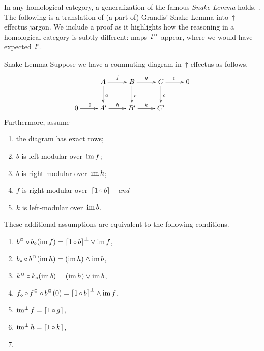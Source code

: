 \documentclass[b]{subfiles}
\begin{document}
\begin{parsec}%
\begin{point}%
In any homological category,
    a generalization of the famous \emph{Snake Lemma} holds.
    \cite[\S3.4]{grandis}.
The following is a translation of (a part of) Grandis' Snake Lemma
    into~$\dagger$-effectus jargon.
We include a proof as it highlights how
    the reasoning in a homological category is subtly different:
    maps~$l^\BOX$ appear, where we would have expected~$l^\diamond$.
\end{point}
\begin{point}{Snake Lemma}%
Suppose we have a commuting
    diagram in~$\dagger$-effectus as follows.
\begin{equation*}
    \xymatrix{
        &A \ar[d]^{a} \ar[r]^f
    &B \ar[d]^{b} \ar[r]^g
    &C \ar[d]^{c} \ar[r]^0
    &0
    \\0 \ar[r]^{0}
    &A' \ar[r]^{h}
    &B' \ar[r]^{k}
    &C'
}
\end{equation*}
Furthermore, assume
\begin{enumerate}
    \item the diagram has exact rows;
    \item  $b$ is left-modular over~$\operatorname{im} f$;
    \item $b$ is right-modular over~$\operatorname{im} h$;
    \item $f$ is right-modular over~$\left\lceil1 \mathop{\circ} b\right\rceil^\perp$ \emph{and}
    \item $k$ is left-modular over~$\operatorname{im} b$.
\end{enumerate}
These additional assumptions are equivalent to the following conditions.
    \begin{multicols}{2}
    \begin{enumerate}
    \item
        $b^\BOX \after b_\diamond (\IM f) = \ceil{1 \after b}^\perp \vee \IM f$,
    \item
        $b_\diamond \after b^\BOX (\IM h)
                = (\IM h) \wedge \IM b$,
    \item
        $k^\BOX \after k_\diamond (\IM b) = (\IM h) \vee \IM b$,
    \item
        $f_\diamond \after f^\BOX \after b^\BOX(0)
                = \ceil{1 \after b}^\perp \wedge \IM f$,
    \item
        $\operatorname{im^\perp} f = \left\lceil1\mathop{\circ} g\right\rceil$,
    \item
        $\operatorname{im^\perp} h = \left\lceil1\mathop{\circ} k\right\rceil$,
    \item

\end{enumerate}
\end{multicols}
\end{point}
\end{parsec}
\end{document}
